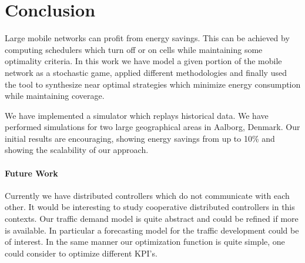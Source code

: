 \section{Conclusion}

Large mobile networks can profit from energy savings. This can be
achieved by computing schedulers which turn off or on cells while
maintaining some optimality criteria.
%
In this work we have model a given portion of the mobile network as a
stochastic game, applied different methodologies and finally used the
tool \stratego to synthesize near optimal strategies which minimize
energy consumption while maintaining coverage.
%

We have implemented a simulator which replays historical data. We have
performed simulations for two large geographical areas in Aalborg,
Denmark.  Our initial results are encouraging, showing energy savings
from up to 10\% and showing the scalability of our approach.


\paragraph{Future Work}

Currently we have distributed controllers which do not communicate
with each other. It would be interesting to study cooperative
distributed controllers in this contexts.  Our traffic demand model is
quite abstract and could be refined if more is available. In
particular a forecasting model for the traffic development could be of
interest. In the same manner our optimization function is quite simple,
one could consider to optimize different KPI's.


